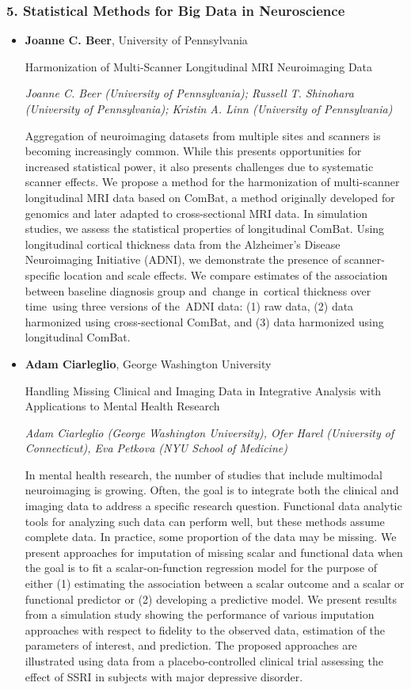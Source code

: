 \subsubsection*{5. Statistical Methods for Big Data in Neuroscience}

\begin{itemize}
\item \textbf{Joanne C. Beer}, University of Pennsylvania

Harmonization of Multi-Scanner Longitudinal MRI Neuroimaging Data

\emph{\footnotesize Joanne C. Beer (University of Pennsylvania); Russell T. Shinohara (University of Pennsylvania); Kristin A. Linn (University of Pennsylvania)}

Aggregation of neuroimaging datasets from multiple sites and scanners is becoming increasingly common. While this presents opportunities for increased statistical power, it also presents challenges due to systematic scanner effects. We propose a method for the harmonization of multi-scanner longitudinal MRI data based on ComBat, a method originally developed for genomics and later adapted to cross-sectional MRI data. In simulation studies, we assess the statistical properties of longitudinal ComBat. Using longitudinal cortical thickness data from the Alzheimer’s Disease Neuroimaging Initiative (ADNI), we demonstrate the presence of scanner-specific location and scale effects. We compare estimates of the association between baseline diagnosis group and change in cortical thickness over time using three versions of the ADNI data: (1) raw data, (2) data harmonized using cross-sectional ComBat, and (3) data harmonized using longitudinal ComBat.

\item \textbf{Adam Ciarleglio}, George Washington University

Handling Missing Clinical and Imaging Data in Integrative Analysis with Applications to Mental Health Research

\emph{\footnotesize Adam Ciarleglio (George Washington University), Ofer Harel (University of Connecticut), Eva Petkova (NYU School of Medicine)}

In mental health research, the number of studies that include multimodal neuroimaging is growing.  Often, the goal is to integrate both the clinical and imaging data to address a specific research question.  Functional data analytic tools for analyzing such data can perform well, but these methods assume complete data.  In practice, some proportion of the data may be missing.  We present approaches for imputation of missing scalar and functional data when the goal is to fit a scalar-on-function regression model for the purpose of either (1) estimating the association between a scalar outcome and a scalar or functional predictor or (2) developing a predictive model.  We present results from a simulation study showing the performance of various imputation approaches with respect to fidelity to the observed data, estimation of the parameters of interest, and prediction.  The proposed approaches are illustrated using data from a placebo-controlled clinical trial assessing the effect of SSRI in subjects with major depressive disorder.


\end{itemize}
